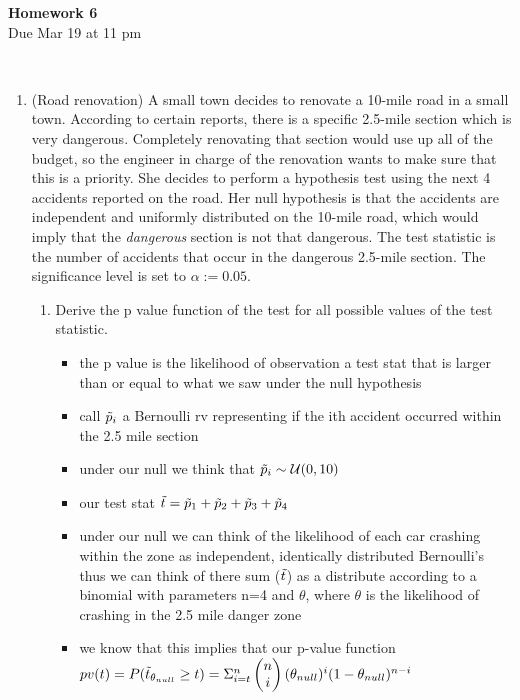 \documentclass[12pt,twoside]{article}
\begin{document}
\begin{center}
{\large{\textbf{Homework 6}} } \vspace{0.2cm}\\
Due Mar 19 at 11 pm
\\
\end{center}
\\

\begin{enumerate}

\item (Road renovation) 
A small town decides to renovate a 10-mile road in a small town. According to certain reports, there is a specific 2.5-mile section which is very dangerous. Completely renovating that section would use up all of the budget, so the engineer in charge of the renovation wants to make sure that this is a priority. She decides to perform a hypothesis test using the next 4 accidents reported on the road. Her null hypothesis is that the accidents are independent and uniformly distributed on the 10-mile road, which would imply that the \emph{dangerous} section is not that dangerous. The test statistic is the number of accidents that occur in the dangerous 2.5-mile section. The significance level is set to $\alpha := 0.05$.
\begin{enumerate}
\item Derive the p value function of the test for all possible values of the test statistic. 
\begin{itemize}
    \color{blue}
    \item the p value is the likelihood of observation a test stat that is larger than or equal to what we saw under the null hypothesis 
\item call $\Tilde{p}_i$ a Bernoulli rv representing if the ith accident occurred within the 2.5 mile section 
\item  under our null we think that $\Tilde{p}_i\sim \mathcal{U}(0,10)$ 
\item our test stat $\Tilde{t}=\Tilde{p}_1+\Tilde{p}_2+\Tilde{p}_3+\Tilde{p}_4$
\item under our null  we can think of the likelihood of each car crashing within the zone as independent, identically distributed Bernoulli's thus we can think of there sum ($\Tilde{t}$) as a distribute according to a binomial with parameters n=4 and $\theta$, where $\theta$ is the likelihood of crashing in the 2.5 mile danger zone
\item we know that this implies that our p-value function $pv(t)=P(\Tilde{t}_{\theta_{null}}\geq t)=\Sigma_{i=t}^{n}\begin{pmatrix}n\\i\end{pmatrix}(\theta_{null})^{i}(1-\theta_{null})^{n-i}$

\end{itemize}
\end{enumerate}
\end{enumerate}
\end{document}
